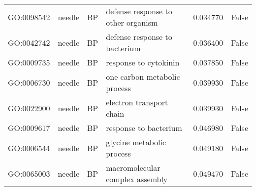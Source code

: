 \begin{longtable}{llllrl}
GO:0098542 & needle & BP &   defense response to other organism  & 0.034770 &   False \\
GO:0042742 & needle & BP &   defense response to bacterium  & 0.036400 &   False \\
GO:0009735 & needle & BP &   response to cytokinin  & 0.037850 &   False \\
GO:0006730 & needle & BP &   one-carbon metabolic process  & 0.039930 &   False \\
GO:0022900 & needle & BP &   electron transport chain  & 0.039930 &   False \\
GO:0009617 & needle & BP &   response to bacterium  & 0.046980 &   False \\
GO:0006544 & needle & BP &   glycine metabolic process  & 0.049180 &   False \\
GO:0065003 & needle & BP &   macromolecular complex assembly  & 0.049470 &   False \\
\bottomrule
\end{longtable}
